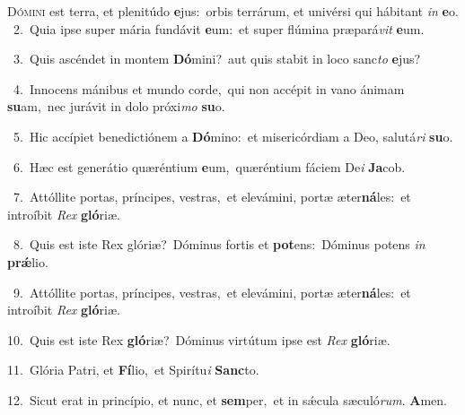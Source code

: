 \lettrine{\initial\textcolor{\initialcolor}{D}}{ómini} est terra, et plenitúdo \textbf{e}\-jus:~\star orbis terrárum, et univérsi qui hábitant \textit{in} \textbf{e}\-o.\\
{\numbfont\textcolor{\numbcolor}{~2.}}~Quia ipse super mária fundávit \textbf{e}\-um:~\star et super flúmina præpará\textit{vit} \textbf{e}\-um.\par
{\numbfont\textcolor{\numbcolor}{~3.}}~Quis ascéndet in montem \textbf{Dó}\-mini?~\star aut quis stabit in loco sanc\textit{to} \textbf{e}\-jus?\par
{\numbfont\textcolor{\numbcolor}{~4.}}~Innocens mánibus et mundo corde,~\dagger qui non accépit in vano ánimam \textbf{su}\-am,~\star nec jurávit in dolo próxi\textit{mo} \textbf{su}\-o.\par
{\numbfont\textcolor{\numbcolor}{~5.}}~Hic accípiet benedictiónem a \textbf{Dó}\-mino:~\star et misericórdiam a Deo, salutá\textit{ri} \textbf{su}\-o.\par
{\numbfont\textcolor{\numbcolor}{~6.}}~Hæc est generátio quæréntium \textbf{e}\-um,~\star quæréntium fáciem De\textit{i} \textbf{Ja}\-cob.\par
{\numbfont\textcolor{\numbcolor}{~7.}}~Attóllite portas, príncipes, vestras,~\dagger et elevámini, portæ æter\-\textbf{ná}\-les:~\star et introíbit \textit{Rex} \textbf{gló}\-riæ.\par
{\numbfont\textcolor{\numbcolor}{~8.}}~Quis est iste Rex glóriæ?~\dagger Dóminus fortis et \textbf{pot}\-ens:~\star Dóminus potens \textit{in} \textbf{prǽ}\-lio.\par
{\numbfont\textcolor{\numbcolor}{~9.}}~Attóllite portas, príncipes, vestras,~\dagger et elevámini, portæ æter\-\textbf{ná}\-les:~\star et introíbit \textit{Rex} \textbf{gló}\-riæ.\par
{\numbfont\textcolor{\numbcolor}{10.}}~Quis est iste Rex \textbf{gló}\-riæ?~\star Dóminus virtútum ipse est \textit{Rex} \textbf{gló}\-riæ.\par
{\numbfont\textcolor{\numbcolor}{11.}}~Glória Patri, et \textbf{Fí}\-lio,~\star et Spirítu\textit{i} \textbf{Sanc}\-to.\par
{\numbfont\textcolor{\numbcolor}{12.}}~Sicut erat in princípio, et nunc, et \textbf{sem}\-per,~\star et in sǽcula sæculó\-\textit{rum}\-. \textbf{A}\-men.\par

